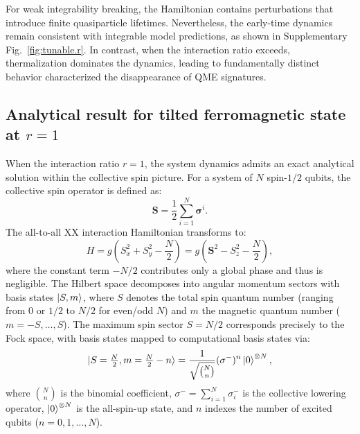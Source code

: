 \documentclass[reprint,superscriptaddress,preprintnumbers,longbibliography,
amsmath,amssymb,aps,floatfix,pra,twocolumn, tightenlines %
]{revtex4-2}
\begin{document}
    For weak integrability breaking, the Hamiltonian contains perturbations that introduce finite quasiparticle lifetimes. Nevertheless, the early-time dynamics remain consistent with integrable model predictions, as shown in Supplementary Fig.~\ref{fig:tunable.r}. In contrast, when the interaction ratio exceeds, thermalization dominates the dynamics, leading to fundamentally distinct behavior characterized the disappearance of QME signatures. 
    
    \subsection{Analytical result for tilted ferromagnetic state at $r=1$}
    \label{subsec:analytical.result}
    When the interaction ratio $r=1$, the system dynamics admits an exact analytical solution within the collective spin picture. For a system of $N$ spin-$1/2$ qubits, the collective spin operator is defined as:
    \[
    \boldsymbol{S} = \frac{1}{2} \sum_{i=1}^N \boldsymbol{\sigma}^i.
    \]
    The all-to-all XX interaction Hamiltonian transforms to:
    \begin{equation}
    H = g \left( S_x^2 + S_y^2 - \frac{N}{2} \right) = g \left( \boldsymbol{S}^2 - S_z^2 - \frac{N}{2} \right),
    \end{equation}
    where the constant term $-N/2$ contributes only a global phase and thus is negligible. 
    The Hilbert space decomposes into angular momentum sectors with basis states $\ket{S, m}$, where $S$ denotes the total spin quantum number (ranging from $0$ or $1/2$ to $N/2$ for even/odd $N$) and $m$ the magnetic quantum number ($m = -S, \dots, S$). The maximum spin sector $S = N/2$ corresponds precisely to the Fock space, with basis states mapped to computational basis states via:
    \begin{equation}
    \ket{S = \tfrac{N}{2}, m = \tfrac{N}{2} - n} = \frac{1}{\sqrt{\binom{N}{n}}} (\sigma^-)^n \ket{0}^{\otimes N},
    \end{equation}
    where $\binom{N}{n}$ is the binomial coefficient, $\sigma^- = \sum_{i=1}^N \sigma_i^-$ is the collective lowering operator, $\ket{0}^{\otimes N}$ is the all-spin-up state, and $n$ indexes the number of excited qubits ($n = 0, 1, \dots, N$).
    
\end{document}
